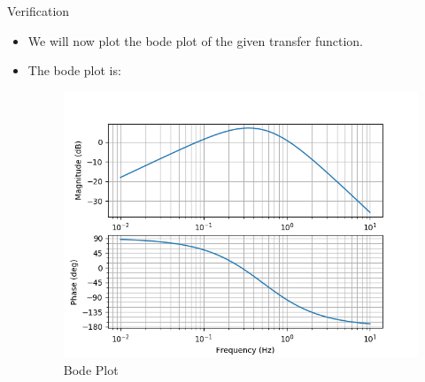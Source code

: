 \documentclass{beamer}
\begin{document}
\begin{frame}{Verification}
    \begin{itemize}
        \item We will now plot the bode plot of the given transfer function.
        \item The bode plot is:
            \begin{figure}
            \includegraphics[scale=0.6]{plot.png}
            \caption{Bode Plot}
            \end{figure}
    \end{itemize}{}
\end{frame}{}
\end{document}
